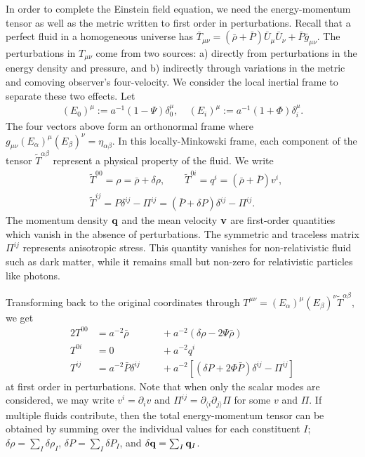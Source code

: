 In order to complete the Einstein field equation, we need the energy-momentum tensor as well as the metric written to first order in perturbations. Recall that a perfect fluid in a homogeneous universe has $\bar{T}_{\mu\nu} = (\bar{\rho} + \bar{P}) \bar{U}_\mu \bar{U}_\nu + \bar{P} \bar{g}_{\mu\nu}$. The perturbations in $T_{\mu\nu}$ come from two sources: a) directly from perturbations in the energy density and pressure, and b) indirectly through variations in the metric and comoving observer's four-velocity. We consider the local inertial frame to separate these two effects. Let
\begin{align}
	(E_0)^\mu := a^{-1} (1 - \Psi) \delta^\mu_0, \quad (E_i)^\mu := a^{-1} (1 + \Phi) \delta^\mu_i. \label{eqn:newtonian_gauge_tetrad}
\end{align}
The four vectors above form an orthonormal frame where $g_{\mu\nu}(E_\alpha)^\mu (E_\beta)^\nu = \eta_{\alpha\beta}$. In this locally-Minkowski frame, each component of the tensor $\tilde{T}^{\alpha\beta}$ represent a physical property of the fluid. We write
\begin{align}
	&\tilde{T}^{00} = \rho = \bar{\rho} + \delta\rho, \qquad \tilde{T}^{0i} = q^i = (\bar{\rho}+\bar{P})v^i, \\
	&\tilde{T}^{ij} = P \delta^{ij} - \Pi^{ij} = (\bar{P} + \delta P) \delta^{ij} - \Pi^{ij}.
\end{align}
The momentum density $\mathbf{q}$ and the mean velocity $\mathbf{v}$ are first-order quantities which vanish in the absence of perturbations. The symmetric and traceless matrix $\Pi^{ij}$ represents anisotropic stress. This quantity vanishes for non-relativistic fluid such as dark matter, while it remains small but non-zero for relativistic particles like photons.

Transforming back to the original coordinates through $T^{\mu\nu}=(E_\alpha)^\mu (E_\beta)^\nu \tilde{T}^{\alpha\beta}$, we get
\begin{alignat}{2}
	T^{00} &= a^{-2} \bar{\rho} &&\;\;+ a^{-2}\left( \delta\rho - 2\Psi\bar{\rho} \right) \label{eqn:perturbed_energy_momentum_tensor_1}\\
	T^{0i} &= 0 &&\;\;+ a^{-2} q^i \label{eqn:perturbed_energy_momentum_tensor_2}\\
	T^{ij} &= a^{-2} \bar{P} \delta^{ij} &&\;\;+ a^{-2} \left[ (\delta P + 2\Phi\bar{P})\delta^{ij} - \Pi^{ij} \right]\label{eqn:perturbed_energy_momentum_tensor_3}
\end{alignat}
at first order in perturbations. Note that when only the scalar modes are considered, we may write $v^i = \partial_i v$ and $\Pi^{ij} = \partial_{\langle i} \partial_{j \rangle} \Pi$ for some $v$ and $\Pi$. If multiple fluids contribute, then the total energy-momentum tensor can be obtained by summing over the individual values for each constituent $I$; $\delta\rho = \sum_I \delta\rho_I$, $\delta P = \sum_I \delta P_I$, and $\delta \mathbf{q} = \sum_I \mathbf{q}_I$.

